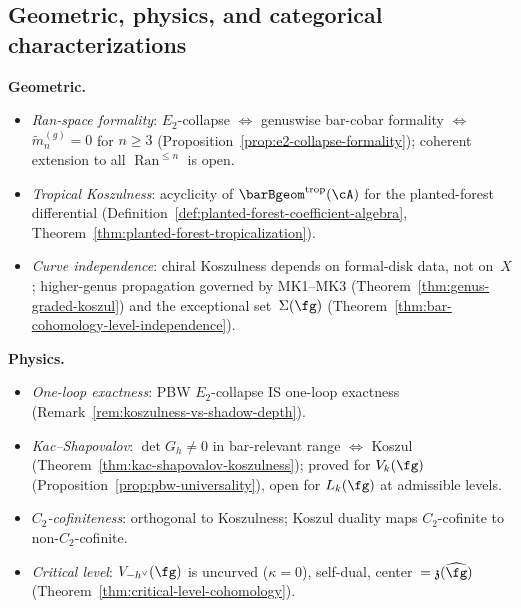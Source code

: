 \subsection{Geometric, physics, and categorical
  characterizations}
\label{subsec:concordance-further-characterizations}

\noindent\textbf{Geometric.}
\begin{itemize}[nosep]
\item \emph{Ran-space formality}: $E_2$-collapse $\Leftrightarrow$ genuswise bar-cobar formality $\Leftrightarrow$ $\tilde{m}_n^{(g)} = 0$ for $n \ge 3$ (Proposition~\ref{prop:e2-collapse-formality}); coherent extension to all $\operatorname{Ran}^{\le n}$ is open.
\item \emph{Tropical Koszulness}: acyclicity of $\barBgeom^{\mathrm{trop}}(\cA)$ for the planted-forest differential (Definition~\ref{def:planted-forest-coefficient-algebra}, Theorem~\ref{thm:planted-forest-tropicalization}).
\item \emph{Curve independence}: chiral Koszulness depends on formal-disk data, not on~$X$; higher-genus propagation governed by MK1--MK3 (Theorem~\ref{thm:genus-graded-koszul}) and the exceptional set~$\Sigma(\fg)$ (Theorem~\ref{thm:bar-cohomology-level-independence}).
\end{itemize}

\smallskip\noindent\textbf{Physics.}
\begin{itemize}[nosep]
\item \emph{One-loop exactness}: PBW $E_2$-collapse IS one-loop exactness (Remark~\ref{rem:koszulness-vs-shadow-depth}).
\item \emph{Kac--Shapovalov}: $\det G_h \neq 0$ in bar-relevant range $\Leftrightarrow$ Koszul (Theorem~\ref{thm:kac-shapovalov-koszulness}); proved for $V_k(\fg)$ (Proposition~\ref{prop:pbw-universality}), open for $L_k(\fg)$ at admissible levels.
\item \emph{$C_2$-cofiniteness}: orthogonal to Koszulness; Koszul duality maps $C_2$-cofinite to non-$C_2$-cofinite.
\item \emph{Critical level}: $V_{-h^\vee}(\fg)$ is uncurved ($\kappa=0$), self-dual, center~$= \mathfrak{z}(\widehat{\fg})$ (Theorem~\ref{thm:critical-level-cohomology}).
\end{itemize}


